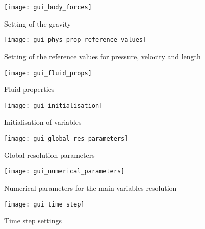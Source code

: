 {{{\begin{figure}[!ht]
\begin{center}
\texttt{[image: gui\_body\_forces]}
\caption{Setting of the gravity}
\label{fig:gui_body_forces}
\end{center}
\end{figure}

\begin{figure}[!ht]
\begin{center}
\texttt{[image: gui\_phys\_prop\_reference\_values]}
\caption{Setting of the reference values for pressure, velocity and length}
\label{fig:gui_reference_values}
\end{center}
\end{figure}

\begin{figure}[!ht]
\begin{center}
\texttt{[image: gui\_fluid\_props]}
\caption{Fluid properties}
\label{fig:gui_fluid_props}
\end{center}
\end{figure}

\begin{figure}[!ht]
\begin{center}
\texttt{[image: gui\_initialisation]}
\caption{Initialisation of variables}
\label{fig:gui_initialisation}
\end{center}
\end{figure}

\begin{figure}[!ht]
\begin{center}
\texttt{[image: gui\_global\_res\_parameters]}
\caption{Global resolution parameters}
\label{fig:gui_global_parameters}
\end{center}
\end{figure}

\begin{figure}[!ht]
\begin{center}
\texttt{[image: gui\_numerical\_parameters]}
\caption{Numerical parameters for the main variables resolution}
\label{fig:gui_numerical_parameters}
\end{center}
\end{figure}

\begin{figure}[!ht]
\begin{center}
\texttt{[image: gui\_time\_step]}
\caption{Time step settings}
\label{fig:gui_time_step}
\end{center}
\end{figure}

}}}
